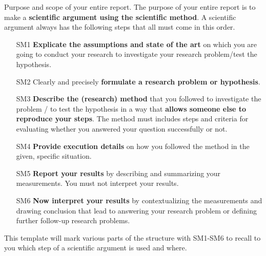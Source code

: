 \documentclass[runningheads,a4paper,english]{llncs}[2018/03/10]
\begin{document}
\textsf{Purpose and scope of your entire report}. The purpose of your entire report is to make a \textbf{scientific argument using the scientific method}. A scientific argument always has the following steps that all must come in this order.
%
\begin{itemize}
    \item[SM1] \textbf{Explicate the assumptions and state of the art} on which you are going to conduct your research to investigate your research problem/test the hypothesis.
    \item[SM2] Clearly and precisely  \textbf{formulate a research problem or hypothesis}.
    \item[SM3] \textbf{Describe the (research) method} that you followed to investigate the problem / to test the hypothesis in a way that \textbf{allows someone else to reproduce your steps}. The method must includes steps and criteria for evaluating whether you answered your question successfully or not.
    \item[SM4] \textbf{Provide execution details} on how you followed the method in the given, specific situation.
    \item[SM5] \textbf{Report your results} by describing and summarizing your measurements. You must not interpret your results.
    \item[SM6] \textbf{Now interpret your results} by contextualizing the measurements and drawing conclusion that lead to answering your research problem or defining further follow-up research problems.
\end{itemize}
%
This template will mark various parts of the structure with SM1-SM6 to recall to you which step of a scientific argument is used and where.
\end{document}
